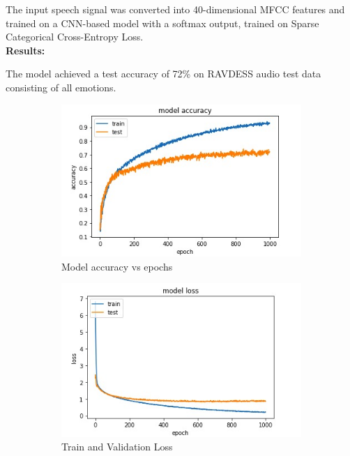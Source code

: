 \documentclass[14pt,a4paper]{article}
\begin{document}
The input speech signal was converted into 40-dimensional MFCC features and trained on a CNN-based model with a softmax output, trained on Sparse Categorical Cross-Entropy Loss.\\
\textbf{Results:}

The model achieved a test accuracy of 72\% on RAVDESS audio test data consisting of all emotions.

\begin{figure}
    \centering
    \begin{subfigure}[b]{0.3\textwidth}
    \includegraphics[width=\textwidth]{../images/graph.jpeg}
    \caption{Model accuracy vs epochs}
    \end{subfigure}
    \begin{subfigure}[b]{0.3\textwidth}
    \includegraphics[width=\textwidth]{../images/graph2.jpeg}
    \caption{Train and Validation Loss}
    \end{subfigure}
    \begin{subfigure}[b]{0.3\textwidth}

\end{subfigure}
\end{figure}
\end{document}
